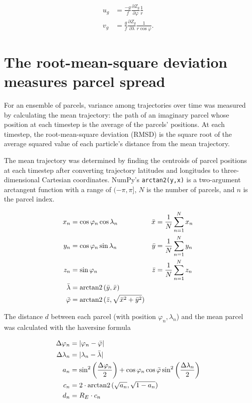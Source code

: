 \begin{align}
    u_g &= \frac{-g}{f} \frac{\partial Z_g}{\partial \varphi} \frac{1}{r} \label{eq:u_g} \\
    v_g &= \frac{g}{f} \frac{\partial Z_g}{\partial \lambda} \frac{1}{r \cos{\varphi}}. \label{eq:v_g}
\end{align}

\section{The root-mean-square deviation measures parcel spread}
For an ensemble of parcels, variance among trajectories over time was measured by calculating the mean trajectory: the path of an imaginary parcel whose position at each timestep is the average of the parcels' positions.
At each timestep, the root-mean-square deviation (RMSD) is the square root of the average squared value of each particle's distance from the mean trajectory.

The mean trajectory was determined by finding the centroids of parcel positions at each timestep after converting trajectory latitudes and longitudes to three-dimensional Cartesian coordinates. 
NumPy's \texttt{arctan2(y,x)} is a two-argument arctangent function with a range of $(-\pi, \pi]$, $N$ is the number of parcels, and $n$ is the parcel index.

\begin{align}
    x_n &= \cos \varphi_n \cos \lambda_n & \bar{x} &= \frac{1}{N} \sum_{n = 1}^{N} x_n \\
    y_n &= \cos \varphi_n \sin \lambda_n & \bar{y} &= \frac{1}{N} \sum_{n = 1}^{N} y_n \\
    z_n &= \sin \varphi_n & \bar{z} &= \frac{1}{N} \sum_{n = 1}^{N} z_n \\
    \bar{\lambda} &= \operatorname{arctan2}{(\bar{y},\bar{x})} \\
    \bar{\varphi} &= \operatorname{arctan2}{(\bar{z}, \sqrt{\bar{x}^2 + \bar{y}^2})}
\end{align}

The distance $d$ between each parcel (with position $\varphi_n, \lambda_n$) and the mean parcel was calculated with the haversine formula

\begin{align}
    \Delta \varphi_n &= | \varphi_n - \bar{\varphi}| \label{eq:delta_lat} \\
    \Delta \lambda_n &= |\lambda_n - \bar{\lambda}| \label{eq:delta_lon} \\
    a_n &= \sin^2 \left ( \frac{\Delta \varphi_n}{2} \right ) + \cos{\varphi_n}  \cos{\bar{\varphi}} \sin^2 \left ( \frac{\Delta \lambda_n}{2} \right ) \\
    c_n &= 2 \cdot \operatorname{arctan2}{(\sqrt{a_n}, \sqrt{1 - a_n})} \\
    d_n &= R_E \cdot c_n
\end{align}

